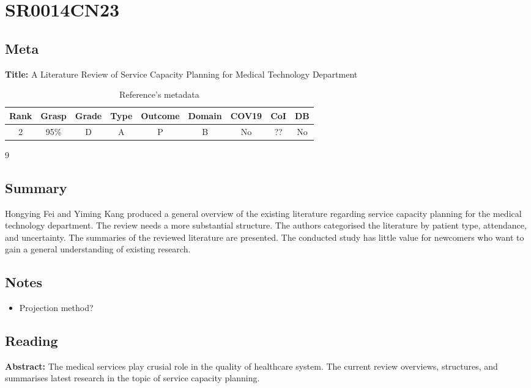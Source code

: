 \section{ SR0014CN23 }


\subsection{Meta}

    \textbf{Title:}
    A Literature Review of Service Capacity Planning for Medical Technology Department

    \begin{table}[H]
        \centering
        \begin{tabular}{|c|c|c|c|c|c|c|c|c|}
            \hline
                \textbf{Rank} & \textbf{Grasp} & \textbf{Grade} & \textbf{Type} & \textbf{Outcome} & \textbf{Domain} & \textbf{COV19} & \textbf{CoI} & \textbf{DB} \\
            \hline
                2 & 95\% & D & A & P & B & No & ?? & No \\
            \hline
        \end{tabular}9
        \caption{Reference's metadata}
        \label{tab:SR0014CN23}
    \end{table}

\subsection{Summary}
    Hongying Fei and Yiming Kang\cite{x243} produced a general overview of the existing literature regarding service capacity planning for the medical technology department. The review needs a more substantial structure. The authors categorised the literature by patient type, attendance, and uncertainty. The summaries of the reviewed literature are presented. The conducted study has little value for newcomers who want to gain a general understanding of existing research.

\subsection{Notes}
    \begin{itemize}
        \item Projection method?
    \end{itemize}


\subsection{Reading}
    \textbf{Abstract:}
    The medical services play crusial role in the quality of healthcare system. The current review overviews, structures, and summarises latest research in the topic of service capacity planning.
    
